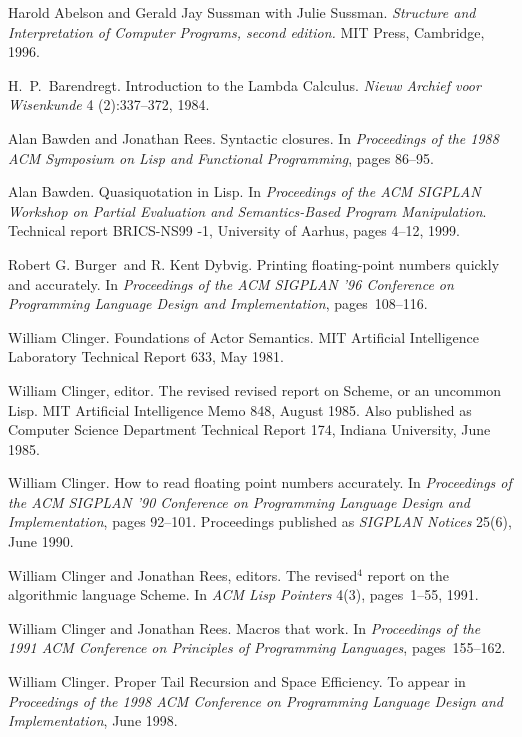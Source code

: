 \begin{thebibliography}{999}

Harold Abelson and Gerald Jay Sussman with Julie Sussman.
{\em Structure and Interpretation of Computer Programs, second edition.}
MIT Press, Cambridge, 1996.

H.~P.~Barendregt.
Introduction to the Lambda Calculus.
{\em Nieuw Archief voor Wisenkunde}
4 (2):337--372, 1984.

Alan Bawden and Jonathan Rees.
Syntactic closures.
In {\em Proceedings of the 1988 ACM Symposium on Lisp and
  Functional Programming}, pages 86--95.

Alan Bawden.
Quasiquotation in Lisp.
In {\em Proceedings of the ACM SIGPLAN Workshop on Partial Evaluation and Semantics-Based Program Manipulation}.
Technical report BRICS-NS99 -1, University of Aarhus,
pages 4--12, 1999.

Robert G. Burger~and R. Kent Dybvig.
Printing floating-point numbers quickly and accurately.
In {\em Proceedings of the ACM SIGPLAN '96 Conference
  on Programming Language Design and Implementation}, pages~108--116.

William Clinger.
Foundations of Actor Semantics.
MIT Artificial Intelligence Laboratory Technical Report 633, May 1981.

William Clinger, editor.
The revised revised report on Scheme, or an uncommon Lisp.
MIT Artificial Intelligence Memo 848, August 1985.
Also published as Computer Science Department Technical Report 174,
  Indiana University, June 1985.

William Clinger.
How to read floating point numbers accurately.
In {\em Proceedings of the ACM SIGPLAN '90 Conference
  on Programming Language Design and Implementation}, pages 92--101.
Proceedings published as {\em SIGPLAN Notices} 25(6), June 1990.

William Clinger and Jonathan Rees, editors.
The revised$^4$ report on the algorithmic language Scheme.
In {\em ACM Lisp Pointers} 4(3), pages~1--55, 1991.

William Clinger and Jonathan Rees.
Macros that work.
In {\em Proceedings of the 1991 ACM Conference on Principles of
  Programming Languages}, pages~155--162.

William Clinger.
Proper Tail Recursion and Space Efficiency.
To appear in {\em Proceedings of the 1998 ACM Conference on Programming
 Language Design and Implementation}, June 1998.


\end{thebibliography}
